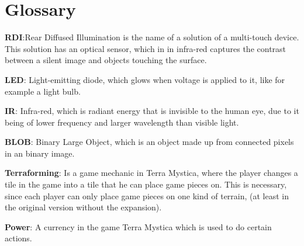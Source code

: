 \chapter*{Glossary}\label{gloss}

\textbf{RDI}:Rear Diffused Illumination is the name of a solution of a multi-touch device\citep{multiTT}. This solution has an optical sensor, which in in infra-red captures the contrast between a silent image and objects touching the surface.

\textbf{LED}: Light-emitting diode, which glows when voltage is applied to it, like for example a light bulb.

\textbf{IR}: Infra-red, which is radiant energy that is invisible to the human eye, due to it being of lower frequency and larger wavelength than visible light.

\textbf{BLOB}: Binary Large Object, which is an object made up from connected pixels in an binary image. 

\textbf{Terraforming}: Is a game mechanic in Terra Mystica, where the player changes a tile in the game into a tile that he can place game pieces on. This is necessary, since each player can only place game pieces on one kind of terrain, (at least in the original version without the expansion).

\textbf{Power}: A currency in the game Terra Mystica which is used to do certain actions.